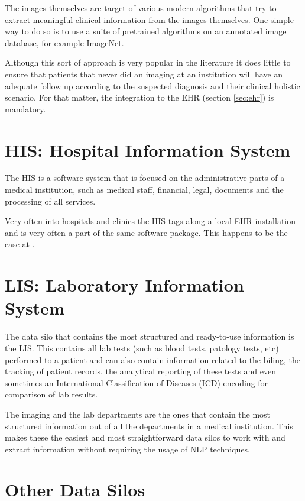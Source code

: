 The images themselves are target of various modern algorithms that try to extract meaningful clinical information from the images themselves. One simple way to do so is to use a suite of pretrained algorithms on an annotated image database, for example ImageNet\cite{deng2009}.

Although this sort of approach is very popular in the literature it does little to ensure that patients that never did an imaging at an institution will have an adequate follow up according to the suspected diagnosis and their clinical holistic scenario. For that matter, the integration to the EHR (section \ref{sec:ehr}) is mandatory.

\section{HIS: Hospital Information System}

The HIS is a software system that is focused on the administrative parts of a medical institution, such as medical staff, financial, legal, documents and the processing of all services. 

Very often into hospitals and clinics the HIS tags along a local EHR installation and is very often a part of the same software package. This happens to be the case at \nomeHsl{}.

\section{LIS: Laboratory Information System}

The data silo that contains the most structured and ready-to-use information is the LIS. This contains all lab tests (such as blood tests, patology tests, etc) performed to a patient and can also contain information related to the biling, the tracking of patient records, the analytical reporting of these tests and even sometimes an International Classification of Diseases (ICD) encoding for comparison of lab results.

The imaging and the lab departments are the ones that contain the most structured information out of all the departments in a medical institution. This makes these the easiest and most straightforward data silos to work with and extract information without requiring the usage of NLP techniques.

\section{Other Data Silos}

